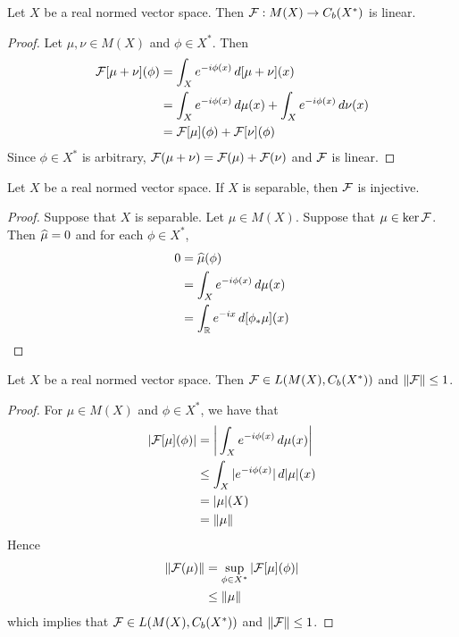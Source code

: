 \documentclass{book}
\begin{document}
\begin{ex}
	Let $X$ be a real normed vector space. Then $\mathcal{F}: M(X) \rightarrow C_b(X^*)$ is linear.
\end{ex}

\begin{proof}
	Let $\mu, \nu \in M(X)$ and $\phi \in X^*$. Then 
	\begin{align*}
		\mathcal{F}[\mu + \nu](\phi) 
		& = \int_X e^{-i \phi(x)} \, d[\mu + \nu](x) \\
		& = \int_X e^{-i \phi(x)} \, d \mu(x) + \int_X e^{-i \phi(x)} \, d \nu(x) \\
		& = \mathcal{F}[\mu](\phi) + \mathcal{F}[\nu](\phi) 
	\end{align*}
	Since $\phi \in X^*$ is arbitrary, $\mathcal{F}(\mu + \nu) = \mathcal{F}(\mu) + \mathcal{F}(\nu)$ and $\mathcal{F}$ is linear.
\end{proof}

\begin{ex}
	Let $X$ be a real normed vector space. If $X$ is separable, then $\mathcal{F}$ is injective.  
\end{ex}

\begin{proof}
	Suppose that $X$ is separable. Let $\mu \in M(X)$. Suppose that $\mu \in \ker \mathcal{F}$. Then $\widehat{\mu} =0$ and for each $\phi \in X^*$, 
	\begin{align*}
		0 
		& = \widehat{\mu}(\phi) \\
		& = \int_X e^{-i \phi(x)} \, d \mu(x) \\
		& = \int_{\mathbb{R}} e^{-ix} \, d[\phi_*\mu](x)
	\end{align*}
	
\end{proof}

\begin{ex}
	Let $X$ be a real normed vector space. Then $\mathcal{F} \in L(M(X), C_b(X^*))$ and $\|\mathcal{F}\| \leq 1$.
\end{ex}

\begin{proof}
	For $\mu \in M(X)$ and $\phi \in X^*$, we have that 
	\begin{align*}
		|\mathcal{F}[\mu](\phi)|
		& =  \bigg| \int_X e^{-i \phi(x)} \, d \mu(x) \bigg| \\
		& \leq \int_X |e^{-i \phi(x)}| \, d|\mu|(x) \\
		& = |\mu|(X) \\
		& = \|\mu\|
	\end{align*}
	Hence 
	\begin{align*}
		\|\mathcal{F}(\mu)\| 
		& = \sup\limits_{\phi \in X^*} |\mathcal{F}[\mu](\phi)| \\
		& \leq \|\mu\|
	\end{align*}
	which implies that $\mathcal{F} \in L(M(X), C_b(X^*))$ and $\|\mathcal{F}\| \leq 1$.
\end{proof}
\end{document}

